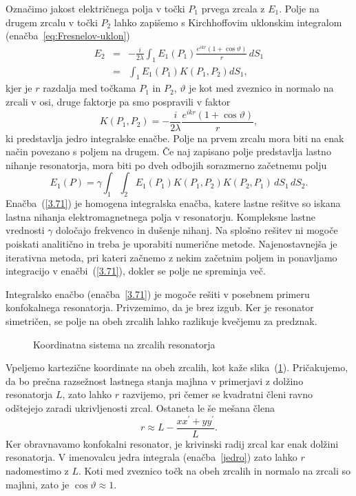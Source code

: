 Označimo jakost električnega polja v točki $P_{1}$ prvega zrcala z $E_{1}$.
Polje na drugem zrcalu v točki $P_2$ lahko zapišemo s Kirchhoffovim uklonskim
integralom (enačba~\ref{eq:Fresnelov-uklon})
\begin{eqnarray}
E_{2} & = & -\frac{i}{2\lambda}\int_{1}E_{1}(P_{1})\frac{e^{ikr}(1+\cos\vartheta)}{r}\, dS_{1} \\
 & = & \int_{1}E_{1}(P_{1})K(P_{1},P_{2})dS_{1},
\label{eq:resuklon}
\end{eqnarray}
kjer je $r$ razdalja med točkama $P_{1}$ in $P_{2}$, $\vartheta$
je kot med zveznico in normalo na zrcali v osi, druge faktorje pa smo pospravili v faktor
\begin{equation}
K(P_{1},P_{2}) = -\frac{i}{2\lambda}\frac{e^{ikr}(1+\cos\vartheta)}{r},
\label{jedro}
\end{equation}
ki predstavlja jedro integralske enačbe. Polje na prvem zrcalu mora
biti na enak način povezano s poljem na drugem. Če naj zapisano polje predstavlja lastno nihanje
resonatorja, mora biti po dveh odbojih sorazmerno začetnemu polju
\begin{equation}
E_{1}(P)=\gamma\int_{1}\int_{2}E_{1}(P_{1})K(P_{1},P_{2})K(P_{2},P_1)\, dS_{1}\, dS_{2}.
\label{3.71}
\end{equation}
Enačba~(\ref{3.71}) je homogena integralska enačba, katere lastne
rešitve so iskana lastna nihanja elektromagnetnega polja v resonatorju.
Kompleksne lastne vrednosti $\gamma$ določajo frekvenco in dušenje
nihanj. Na splošno rešitev ni mogoče poiskati analitično in treba je uporabiti 
numerične metode. Najenostavnejša je iterativna
metoda, pri kateri začnemo z nekim začetnim poljem in ponavljamo integracijo
v enačbi~(\ref{3.71}), dokler se polje ne spreminja več.

Integralsko enačbo (enačba~\ref{3.71}) je mogoče rešiti v posebnem primeru
konfokalnega resonatorja. Privzemimo, da je brez izgub. 
Ker je resonator simetričen, se polje na obeh zrcalih lahko razlikuje kvečjemu
za predznak.
\begin{figure}[h]
\centering
\def\svgwidth{110truemm} 

\caption{Koordinatna sistema na zrcalih resonatorja}
\label{fig:uklon_res_shema}
\end{figure}
Vpeljemo kartezične koordinate na obeh zrcalih, kot kaže slika~(\ref{fig:uklon_res_shema}).
Pričakujemo, da bo prečna razsežnost lastnega stanja majhna v primerjavi
z dolžino resonatorja $L$, zato lahko $r$ razvijemo, pri čemer se kvadratni členi ravno odštejejo 
zaradi ukrivljenosti zrcal. Ostaneta le še mešana člena
\begin{equation}
r\approx L-\frac{xx^{\prime}+yy^{\prime}}{L}.
\label{3.72}
\end{equation}
Ker obravnavamo konfokalni resonator, je krivinski radij zrcal kar enak dolžini resonatorja.
V imenovalcu jedra integrala (enačba~\ref{jedro}) zato lahko $r$ nadomestimo
z $L$. Koti med zveznico točk na obeh zrcalih in normalo na zrcali
so majhni, zato je  $\cos\vartheta \approx 1$. 

